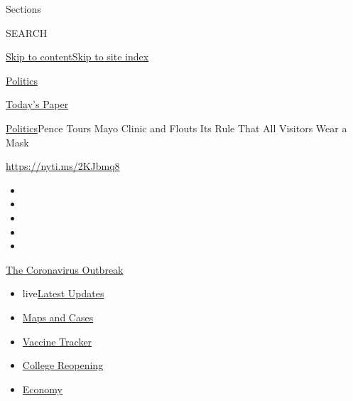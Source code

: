 Sections

SEARCH

\protect\hyperlink{site-content}{Skip to
content}\protect\hyperlink{site-index}{Skip to site index}

\href{https://www.nytimes3xbfgragh.onion/section/politics}{Politics}

\href{https://myaccount.nytimes3xbfgragh.onion/auth/login?response_type=cookie\&client_id=vi}{}

\href{https://www.nytimes3xbfgragh.onion/section/todayspaper}{Today's
Paper}

\href{/section/politics}{Politics}\textbar{}Pence Tours Mayo Clinic and
Flouts Its Rule That All Visitors Wear a Mask

\url{https://nyti.ms/2KJbmq8}

\begin{itemize}
\item
\item
\item
\item
\item
\end{itemize}

\href{https://www.nytimes3xbfgragh.onion/news-event/coronavirus?action=click\&pgtype=Article\&state=default\&region=TOP_BANNER\&context=storylines_menu}{The
Coronavirus Outbreak}

\begin{itemize}
\tightlist
\item
  live\href{https://www.nytimes3xbfgragh.onion/2020/08/04/world/coronavirus-cases.html?action=click\&pgtype=Article\&state=default\&region=TOP_BANNER\&context=storylines_menu}{Latest
  Updates}
\item
  \href{https://www.nytimes3xbfgragh.onion/interactive/2020/us/coronavirus-us-cases.html?action=click\&pgtype=Article\&state=default\&region=TOP_BANNER\&context=storylines_menu}{Maps
  and Cases}
\item
  \href{https://www.nytimes3xbfgragh.onion/interactive/2020/science/coronavirus-vaccine-tracker.html?action=click\&pgtype=Article\&state=default\&region=TOP_BANNER\&context=storylines_menu}{Vaccine
  Tracker}
\item
  \href{https://www.nytimes3xbfgragh.onion/2020/08/02/us/covid-college-reopening.html?action=click\&pgtype=Article\&state=default\&region=TOP_BANNER\&context=storylines_menu}{College
  Reopening}
\item
  \href{https://www.nytimes3xbfgragh.onion/live/2020/08/04/business/stock-market-today-coronavirus?action=click\&pgtype=Article\&state=default\&region=TOP_BANNER\&context=storylines_menu}{Economy}
\end{itemize}

